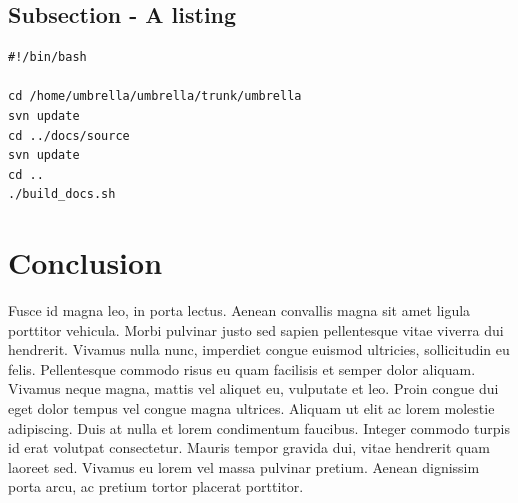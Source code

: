 \subsection{Subsection - A listing}



\lstset{tabsize=2,language=bash}
\begin{lstlisting}[breaklines=true,frame=single,caption={Shell-script that handles the complete build process of the documentation},label=lst:cron-job]
#!/bin/bash

cd /home/umbrella/umbrella/trunk/umbrella
svn update
cd ../docs/source
svn update
cd ..
./build_docs.sh
\end{lstlisting}




\newpage
\section{Conclusion}
Fusce id magna leo, in porta lectus. Aenean convallis magna sit amet ligula
porttitor vehicula. Morbi pulvinar justo sed sapien pellentesque vitae viverra
dui hendrerit. Vivamus nulla nunc, imperdiet congue euismod ultricies,
sollicitudin eu felis. Pellentesque commodo risus eu quam facilisis et semper
dolor aliquam. Vivamus neque magna, mattis vel aliquet eu, vulputate et leo.
Proin congue dui eget dolor tempus vel congue magna ultrices. Aliquam ut elit
ac lorem molestie adipiscing. Duis at nulla et lorem condimentum faucibus.
Integer commodo turpis id erat volutpat consectetur. Mauris tempor gravida
dui, vitae hendrerit quam laoreet sed. Vivamus eu lorem vel massa pulvinar
pretium. Aenean dignissim porta arcu, ac pretium tortor placerat porttitor. 







